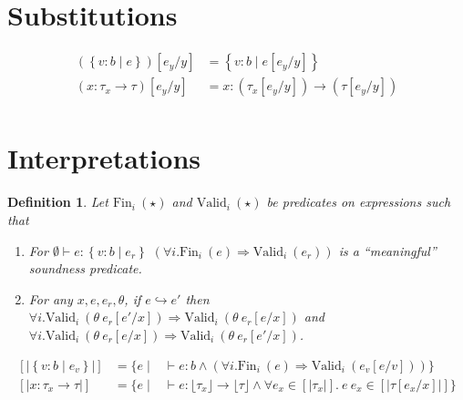\documentclass[10pt,a4paper]{article}
\newtheorem{definition}{Definition}
\newcommand\eapp[2]{\ensuremath{#1 \ #2}}
\newcommand\edata[2]{\ensuremath{#1 \ #2}}
\newcommand\tref[3]{\ensuremath{\left\lbrace {#1} \colon {#2} \mid {#3} \right\rbrace}}
\newcommand\tconref[4]{\tref{#3}{\tcon{#1}{#2}}{#4}}
\newcommand\tcon[2]{\ensuremath{#1\ #2}}
\newcommand\tfun[3]{\ensuremath{#1\colon #2 \rightarrow #3}}
\newcommand\validi[1]{\ensuremath{\text{Valid}_{i}\ (#1)}}
\newcommand\fini[1]{\ensuremath{\text{Fin}_{i}\ (#1)}}
\newcommand\generalconditionInterp[2]
	{\ensuremath{(\forall i. \fini{#1} \Rightarrow \validi{#2})}}
\newcommand\generalconditionImpl[2]
	{\ensuremath{\forall i . \validi{#1} \Rightarrow \validi{#2}}}
\newcommand\ty[1]{\ensuremath{\text{ty}({#1})}}
\newcommand\sub[2]{\ensuremath{\left[ #2 / #1 \right]}}
\newcommand\erase[1]{\ensuremath{\lfloor #1 \rfloor}}
\newcommand\interp[1]{\ensuremath{[|#1|]}}
\newcommand\eval[2]{\ensuremath{#1 \hookrightarrow #2}}
\newcommand\evals[2]{\ensuremath{#1 \hookrightarrow^\star #2}}
\newcommand\hastype[3]{\ensuremath{#1 \vdash #2 \colon #3}}
\begin{document}
\section*{Substitutions}
\begin{align*}
(\tref{v}{b}{e})\sub{y}{e_y} &=\tref{v}{b}{e\sub{y}{e_y}}\\
(\tfun{x}{\tau_x}{\tau})\sub{y}{e_y} &=\tfun{x}{(\tau_x\sub{y}{e_y})}{(\tau\sub{y}{e_y})}\\
\end{align*}

\section*{Interpretations}
\begin{definition} \label{def:valid}
Let \fini{\star} and \validi{\star} be predicates on expressions such that
\begin{enumerate}
\item 
	For \hastype{\emptyset}{e}{\tref{v}{b}{e_r}}
	\generalconditionInterp{e}{e_r} is a ``meaningful''
	soundness predicate.

\item For any $x, e, e_r, \theta$, if \eval{e}{e'} then 
	\generalconditionImpl{\theta\ e_r\sub{x}{e'}}{\theta\ e_r\sub{x}{e}} and
	\generalconditionImpl{\theta\ e_r\sub{x}{e}}{\theta\ e_r\sub{x}{e'}}.
\end{enumerate} 
\end{definition}

$$
\begin{array}{lll}
\interp{\tref{v}{b}{e_v}} &=
	\{e \mid & \hastype{}{e}{b} 
	\land 
	\generalconditionInterp{e}{e_v\sub{v}{e}} 
	\}\\
\interp{\tfun{x}{\tau_x}{\tau}} &=
	\{e \mid & \hastype{}{e}{\erase{\tau_x} \rightarrow \erase{\tau}} 
	\land 
	\forall e_x \in \interp{\tau_x}. \
	 \eapp{e}{e_x} \in \interp{\tau\sub{x}{e_x}} 
	 \}\\
\end{array}
$$
\end{document}

